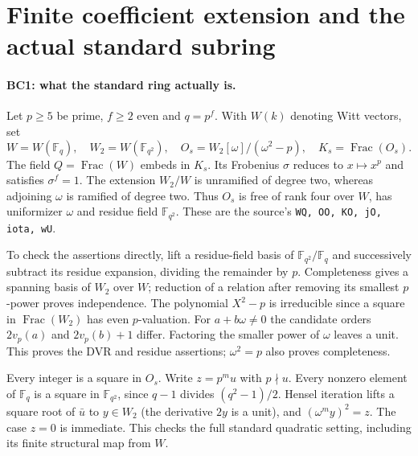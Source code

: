 \section{Finite coefficient extension and the actual standard subring}
\label{sec:finite-base-change}


\paragraph{BC1: what the standard ring actually is.}
Let $p\ge5$ be prime, $f\ge2$ even and $q=p^f$. With $W(k)$ denoting
Witt vectors, set
\[
 W=W(\mathbb F_q),\quad W_2=W(\mathbb F_{q^2}),\quad
 O_s=W_2[\omega]/(\omega^2-p),\quad K_s=\operatorname{Frac}(O_s).
                                                               \tag{BC.1}
\]
The field $Q=\operatorname{Frac}(W)$ embeds in $K_s$. Its Frobenius
$\sigma$ reduces to $x\mapsto x^p$ and satisfies $\sigma^f=1$.
The extension $W_2/W$ is unramified of degree two, whereas adjoining
$\omega$ is ramified of degree two. Thus $O_s$ is free of rank four
over $W$, has uniformizer $\omega$ and residue field $\mathbb F_{q^2}$.
These are the source's \texttt{WQ, OO, KO, jO, iota, wU}.

To check the assertions directly, lift a residue-field basis of
$\mathbb F_{q^2}/\mathbb F_q$ and successively subtract its residue
expansion, dividing the remainder by $p$. Completeness gives a spanning
basis of $W_2$ over $W$; reduction of a relation after removing its
smallest $p$-power proves independence. The polynomial $X^2-p$ is
irreducible since a square in $\operatorname{Frac}(W_2)$ has even
$p$-valuation. For $a+b\omega\ne0$ the candidate orders
$2v_p(a)$ and $2v_p(b)+1$ differ. Factoring the smaller power of
$\omega$ leaves a unit. This proves the DVR and residue assertions;
$\omega^2=p$ also proves completeness.

Every integer is a square in $O_s$. Write $z=p^m u$ with $p\nmid u$.
Every nonzero element of $\mathbb F_q$ is a square in
$\mathbb F_{q^2}$, since $q-1$ divides $(q^2-1)/2$.
Hensel iteration lifts a square root of $\bar u$ to $y\in W_2$
(the derivative $2y$ is a unit), and $(\omega^m y)^2=z$.
The case $z=0$ is immediate. This checks the full standard quadratic
setting, including its finite structural map from $W$.

